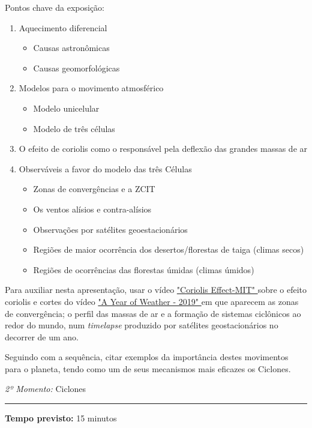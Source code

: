 Pontos chave da exposição:
\begin{enumerate}[label=\alph *)]
		\item Aquecimento diferencial
			\begin{itemize}
					\item Causas astronômicas
					\item Causas geomorfológicas
			\end{itemize}
		\item Modelos para o movimento atmosférico
			\begin{itemize}
					\item Modelo unicelular
					\item Modelo de três células
			\end{itemize}
		\item O efeito de coriolis como o responsável pela deflexão das grandes massas de ar
		\item Observáveis a favor do modelo das três Células
			\begin{itemize}
					\item Zonas de convergências e a ZCIT
					\item Os ventos alísios e contra-alísios
					\item Observações por satélites geoestacionários
					\item Regiões de maior ocorrência dos desertos/florestas de taiga (climas secos)
					\item Regiões de ocorrências das florestas úmidas (climas úmidos)
			\end{itemize}
\end{enumerate}
Para auxiliar nesta apresentação, usar o vídeo \href{https://youtu.be/dt_XJp77-mk}{"Coriolis Effect-MIT" }sobre o efeito coriolis e cortes do vídeo \href{https://youtu.be/8w3o6_cn-O8}{"A Year of Weather - 2019" }em que aparecem as zonas de convergência; o perfil das massas de ar e a formação de sistemas ciclônicos ao redor do mundo, num \textit{timelapse} produzido por satélites geostacionários no decorrer de um ano.

Seguindo com a sequência, citar exemplos da importância destes movimentos para o planeta, tendo como um de seus mecanismos mais eficazes os Ciclones.

\vspace{50pt}
\par\noindent\emph{2º Momento:} Ciclones
\par\noindent\rule{.3\textwidth}{.5pt}    
\par\noindent\textbf{Tempo previsto:} 15 minutos

